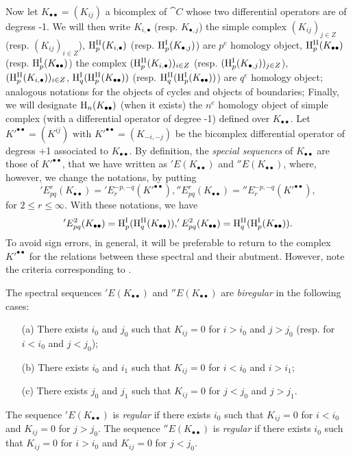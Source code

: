 \begin{env}[11.3.5]
\label{0.11.3.5}
Now let $K_{\bullet\bullet} = (K_{ij})$ a bicomplex of $\cat{C}$ whose two differential operators are of degress -1.
We will then write 
$K_{i, \bullet}$ (resp. $K_{\bullet, j}$) the simple complex $(K_{ij})_{j\in Z}$ (resp. $(K_{ij})_{i\in Z}$), 
$\mathrm{H}_{p}^\text{II}(K_{i, \bullet})$ (resp. $\mathrm{H}_{p}^\text{I}(K_{\bullet, j})$) are $p^e$ homology object,
$\mathrm{H}_{p}^\text{II}(K_{\bullet\bullet})$ (resp. $\mathrm{H}_{p}^\text{I}(K_{\bullet\bullet})$) the complex $(\mathrm{H}_{p}^\text{II}(K_{i, \bullet}))_{i \in Z}$ (resp. $(\mathrm{H}_{p}^\text{I}(K_{\bullet, j}))_{j \in Z}$), $(\mathrm{H}_{p}^\text{II}(K_{i, \bullet}))_{i \in Z}$, 
$\mathrm{H}_q^\text{I}(\mathrm{H}_{p}^\text{II}(K_{\bullet\bullet}))$ (resp. $\mathrm{H}_q^\text{II}(\mathrm{H}_{p}^\text{I}(K_{\bullet\bullet}))$) are $q^e$ homology object;
analogous notations for the objects of cycles and objects of boundaries;
Finally, we will designate $\mathrm{H}_n(K_{\bullet\bullet})$ (when it exists) the $n^e$ homology object of simple complex (with a differential operator of degree -1) defined over $K_{\bullet\bullet}$.
Let $K'^{\bullet\bullet} = (K^{ij})$ with $K'^{\bullet\bullet} = (K_{-i,-j})$ be the bicomplex differential operator of degress +1 associated to $K_{\bullet\bullet}$.
By definition, the \emph{special sequences} of $K_{\bullet\bullet}$ are those of $K'^{\bullet\bullet}$, that we have written as $'E(K_{\bullet\bullet})$ and $''E(K_{\bullet\bullet})$, 
where, however, we change the notations, by putting
  \[
    'E_{pq}^{r}(K_{\bullet\bullet}) = 'E_{r}^{-p,-q}(K'^{\bullet\bullet}), ''E_{pq}^{r}(K_{\bullet\bullet}) = ''E_{r}^{-p,-q}(K'^{\bullet\bullet}), 
  \]
for $2\leq r \leq \infty$. With these notations, we have
  \[
    'E_{pq}^{2}(K_{\bullet\bullet}) = \mathrm{H}_{p}^\text{I}(\mathrm{H}_{q}^\text{II}(K_{\bullet\bullet})), 'E_{pq}^{2}(K_{\bullet\bullet}) = \mathrm{H}_{q}^\text{II}(\mathrm{H}_{p}^\text{I}(K_{\bullet\bullet})).
  \]
To avoid sign errors, in general, it will be preferable to return to the complex $K'^{\bullet\bullet}$ for the relations between these spectral and their abutment.
However, note the criteria corresponding to .
\end{env}

\begin{env}[11.3.6]
\label{0.11.3.6}
The spectral sequences $'E(K_{\bullet\bullet})$ and $''E(K_{\bullet\bullet})$ are \emph{biregular} in the following cases:
\begin{enumerate}
  \item[(a)] There exists $i_0$ and $j_0$ such that $K_{ij}=0$ for $i>i_0$ and $j>j_0$ (resp. for $i<i_0$ and $j<j_0$);
  \item[(b)] There exists $i_0$ and $i_1$ such that $K_{ij}=0$ for $i<i_0$ and $i>i_1$;
  \item[(c)] There exists $j_0$ and $j_1$ such that $K_{ij}=0$ for $j<j_0$ and $j>j_1$.
\end{enumerate}
The sequence $'E(K_{\bullet\bullet})$ is \emph{regular} if there exists $i_0$ such that $K_{ij}=0$ for $i<i_0$ and $K_{ij}=0$ for $j>j_0$.
The sequence $''E(K_{\bullet\bullet})$ is \emph{regular} if there exists $i_0$ such that $K_{ij}=0$ for $i>i_0$ and $K_{ij}=0$ for $j<j_0$.
\end{env}

